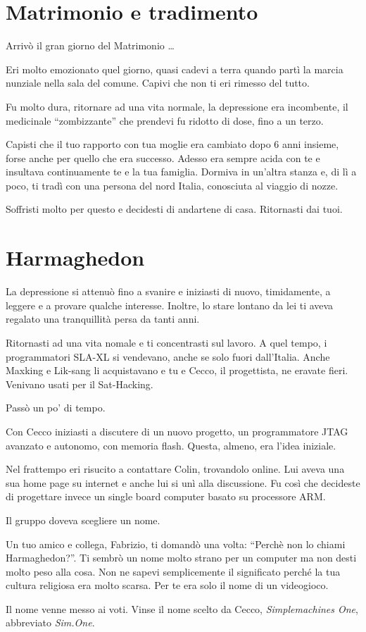 \section{Matrimonio e tradimento}
\label{matrimonio_e_tradimento}

Arrivò il gran giorno del Matrimonio \ldots

Eri molto emozionato quel giorno, quasi cadevi a terra quando partì la marcia nunziale nella sala del comune. Capivi che non ti eri rimesso del tutto.

Fu molto dura, ritornare ad una vita normale, la depressione era incombente, il medicinale ``zombizzante'' che prendevi fu ridotto di dose, fino a un terzo.

Capisti che il tuo rapporto con tua moglie era cambiato dopo 6 anni insieme, forse anche per quello che era successo. Adesso era sempre acida con te e insultava continuamente te e la tua famiglia. Dormiva in un'altra stanza e, di lì a poco, ti tradì con una persona del nord Italia, conosciuta al viaggio di nozze.

Soffristi molto per questo e decidesti di andartene di casa. Ritornasti dai tuoi.
 
\section{Harmaghedon}
\label{harmaghedon}
 
La depressione si attenuò fino a svanire e iniziasti di nuovo, timidamente, a leggere e a provare qualche interesse. Inoltre, lo stare lontano da lei ti aveva regalato una tranquillità persa da tanti anni.

Ritornasti ad una vita nomale e ti concentrasti sul lavoro. A quel tempo, i programmatori SLA-XL si vendevano, anche se solo fuori dall'Italia. Anche Maxking e Lik-sang li acquistavano e tu e Cecco, il progettista, ne eravate fieri. Venivano usati per il Sat-Hacking.

Passò un po' di tempo.

Con Cecco iniziasti a discutere di un nuovo progetto, un programmatore JTAG avanzato e autonomo, con memoria flash. Questa, almeno, era l'idea iniziale.

Nel frattempo eri risucito a contattare Colin, trovandolo online. Lui aveva una sua home page su internet e anche lui si unì alla discussione. Fu così che decideste di progettare invece un single board computer basato su processore ARM.

Il gruppo doveva scegliere un nome.

Un tuo amico e collega, Fabrizio, ti domandò una volta: “Perchè non lo chiami Harmaghedon?”. Ti sembrò un nome molto strano per un computer ma non desti molto peso alla cosa. Non ne sapevi semplicemente il significato perché la tua cultura religiosa era molto scarsa. Per te era solo il nome di un videogioco.

Il nome venne messo ai voti. Vinse il nome scelto da Cecco, \textit{Simplemachines One}, abbreviato \textit{Sim.One}.
